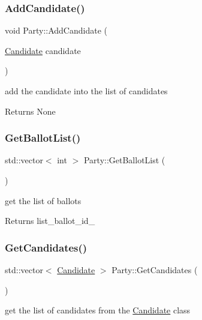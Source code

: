\subsubsection{\texorpdfstring{Add\+Candidate()}{AddCandidate()}}
{\footnotesize\ttfamily void Party\+::\+Add\+Candidate (\begin{DoxyParamCaption}\item[{\hyperlink{classCandidate}{Candidate}}]{candidate }\end{DoxyParamCaption})}



add the candidate into the list of candidates 

\begin{DoxyReturn}{Returns}
None 
\end{DoxyReturn}
\mbox{\label{classParty_a7a97cdb859c34604b1a952df0151b7f3}} 
\subsubsection{\texorpdfstring{Get\+Ballot\+List()}{GetBallotList()}}
{\footnotesize\ttfamily std\+::vector$<$ int $>$ Party\+::\+Get\+Ballot\+List (\begin{DoxyParamCaption}{ }\end{DoxyParamCaption})}



get the list of ballots 

\begin{DoxyReturn}{Returns}
list\+\_\+ballot\+\_\+id\+\_\+ 
\end{DoxyReturn}
\mbox{\label{classParty_a44a8a31088ed290f2cc59d6a42e81c07}} 
\subsubsection{\texorpdfstring{Get\+Candidates()}{GetCandidates()}}
{\footnotesize\ttfamily std\+::vector$<$ \hyperlink{classCandidate}{Candidate} $>$ Party\+::\+Get\+Candidates (\begin{DoxyParamCaption}{ }\end{DoxyParamCaption})}



get the list of candidates from the \hyperlink{classCandidate}{Candidate} class 

